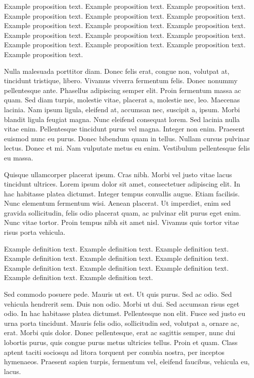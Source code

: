 \documentclass[ASNA,twocolumn]{USG} %
\begin{document}
{\begin{proposition}
Example proposition text. Example proposition text. Example proposition text. Example proposition text. Example proposition text. Example proposition text. Example proposition text. Example proposition text. Example proposition text. Example proposition text. Example proposition text. Example proposition text. Example proposition text. Example proposition text. Example proposition text. Example proposition text.
\end{proposition}

Nulla malesuada porttitor diam. Donec felis erat, congue non, volutpat at, tincidunt tristique, libero. Vivamus
viverra fermentum felis. Donec nonummy pellentesque ante. Phasellus adipiscing semper elit. Proin fermentum massa
ac quam. Sed diam turpis, molestie vitae, placerat a, molestie nec, leo. Maecenas lacinia. Nam ipsum ligula, eleifend
at, accumsan nec, suscipit a, ipsum. Morbi blandit ligula feugiat magna. Nunc eleifend consequat lorem. Sed lacinia
nulla vitae enim. Pellentesque tincidunt purus vel magna. Integer non enim. Praesent euismod nunc eu purus. Donec
bibendum quam in tellus. Nullam cursus pulvinar lectus. Donec et mi. Nam vulputate metus eu enim. Vestibulum
pellentesque felis eu massa.

Quisque ullamcorper placerat ipsum. Cras nibh. Morbi vel justo vitae lacus tincidunt ultrices. Lorem ipsum dolor sit
amet, consectetuer adipiscing elit. In hac habitasse platea dictumst. Integer tempus convallis augue. Etiam facilisis.
Nunc elementum fermentum wisi. Aenean placerat. Ut imperdiet, enim sed gravida sollicitudin, felis odio placerat
quam, ac pulvinar elit purus eget enim. Nunc vitae tortor. Proin tempus nibh sit amet nisl. Vivamus quis tortor
vitae risus porta vehicula.

\begin{definition}
Example definition text. Example definition text. Example definition text. Example definition text. Example definition text. Example definition text. Example definition text. Example definition text. Example definition text. Example definition text. Example definition text.
\end{definition}

Sed commodo posuere pede. Mauris ut est. Ut quis purus. Sed ac odio. Sed vehicula hendrerit sem. Duis non
odio. Morbi ut dui. Sed accumsan risus eget odio. In hac habitasse platea dictumst. Pellentesque non elit. Fusce
sed justo eu urna porta tincidunt. Mauris felis odio, sollicitudin sed, volutpat a, ornare ac, erat. Morbi quis dolor.
Donec pellentesque, erat ac sagittis semper, nunc dui lobortis purus, quis congue purus metus ultricies tellus. Proin
et quam. Class aptent taciti sociosqu ad litora torquent per conubia nostra, per inceptos hymenaeos. Praesent sapien
turpis, fermentum vel, eleifend faucibus, vehicula eu, lacus.

}
\end{document}
